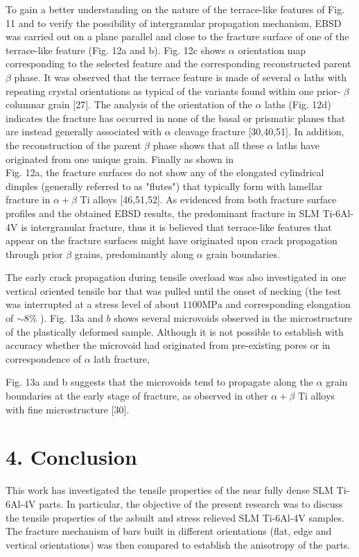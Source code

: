 \documentclass[10pt]{article}
\begin{document}
To gain a better understanding on the nature of the terrace-like features of Fig. 11 and to verify the possibility of intergranular propagation mechanism, EBSD was carried out on a plane parallel and close to the fracture surface of one of the terrace-like feature (Fig. 12a and b). Fig. 12c shows $\alpha$ orientation map corresponding to the selected feature and the corresponding reconstructed parent $\beta$ phase. It was observed that the terrace feature is made of several $\alpha$ laths with repeating crystal orientations as typical of the variants found within one prior- $\beta$ columnar grain [27]. The analysis of the orientation of the $\alpha$ laths (Fig. 12d) indicates the fracture has occurred in none of the basal or prismatic planes that are instead generally associated with $\alpha$ cleavage fracture [30,40,51]. In addition, the reconstruction of the parent $\beta$ phase shows that all these $\alpha$ laths have originated from one unique grain. Finally as shown in\\
Fig. 12a, the fracture surfaces do not show any of the elongated cylindrical dimples (generally referred to as "flutes") that typically form with lamellar fracture in $\alpha+\beta$ Ti alloys [46,51,52]. As evidenced from both fracture surface profiles and the obtained EBSD results, the predominant fracture in SLM Ti-6Al-4V is intergranular fracture, thus it is believed that terrace-like features that appear on the fracture surfaces might have originated upon crack propagation through prior $\beta$ grains, predominantly along $\alpha$ grain boundaries.

The early crack propagation during tensile overload was also investigated in one vertical oriented tensile bar that was pulled until the onset of necking (the test was interrupted at a stress level of about $1100 \mathrm{MPa}$ and corresponding elongation of $\sim 8 \%$ ). Fig. 13a and $b$ shows several microvoids observed in the microstructure of the plastically deformed sample. Although it is not possible to establish with accuracy whether the microvoid had originated from pre-existing pores or in correspondence of $\alpha$ lath fracture,

Fig. 13a and b suggests that the microvoids tend to propagate along the $\alpha$ grain boundaries at the early stage of fracture, as observed in other $\alpha+\beta$ Ti alloys with fine microstructure [30].

\section*{4. Conclusion}
This work has investigated the tensile properties of the near fully dense SLM Ti-6Al-4V parts. In particular, the objective of the present research was to discuss the tensile properties of the asbuilt and stress relieved SLM Ti-6Al-4V samples. The fracture mechanism of bars built in different orientations (flat, edge and vertical orientations) was then compared to establish the anisotropy of the parts.
\end{document}
